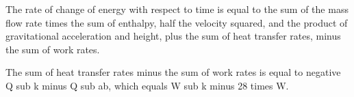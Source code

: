 The rate of change of energy with respect to time is equal to the sum of the mass flow rate times the sum of enthalpy, half the velocity squared, and the product of gravitational acceleration and height, plus the sum of heat transfer rates, minus the sum of work rates.

The sum of heat transfer rates minus the sum of work rates is equal to negative Q sub k minus Q sub ab, which equals W sub k minus 28 times W.